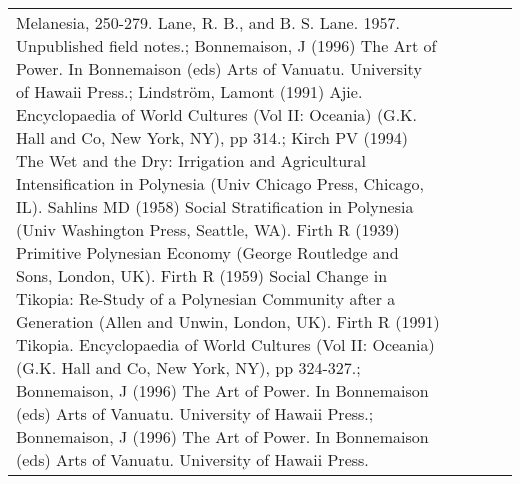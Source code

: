 \begin{longtable}{p{2cm}p{2cm}p{2cm}p{5cm}p{7cm}}
Melanesia, 250-279. Lane, R. B., and B. S. Lane. 1957. Unpublished field notes.; Bonnemaison, J (1996) The Art of Power. In Bonnemaison (eds) Arts of Vanuatu. University of Hawaii Press.; Lindström, Lamont (1991) Ajie. Encyclopaedia of World Cultures (Vol II: Oceania) (G.K. Hall and Co, New York, NY), pp 314.; Kirch PV (1994) The Wet and the Dry: Irrigation and Agricultural Intensification in Polynesia (Univ Chicago Press, Chicago, IL). Sahlins MD (1958) Social Stratification in Polynesia (Univ Washington Press, Seattle, WA). Firth R (1939) Primitive Polynesian Economy (George Routledge and Sons, London, UK). Firth R (1959) Social Change in Tikopia: Re-Study of a Polynesian Community after a Generation (Allen and Unwin, London, UK). Firth R (1991) Tikopia. Encyclopaedia of World Cultures (Vol II: Oceania) (G.K. Hall and Co, New York, NY), pp 324-327.; Bonnemaison, J (1996) The Art of Power. In Bonnemaison (eds) Arts of Vanuatu. University of Hawaii Press.; Bonnemaison, J (1996) The Art of Power. In Bonnemaison (eds) Arts of Vanuatu. University of Hawaii Press. \\ 

\end{longtable}
